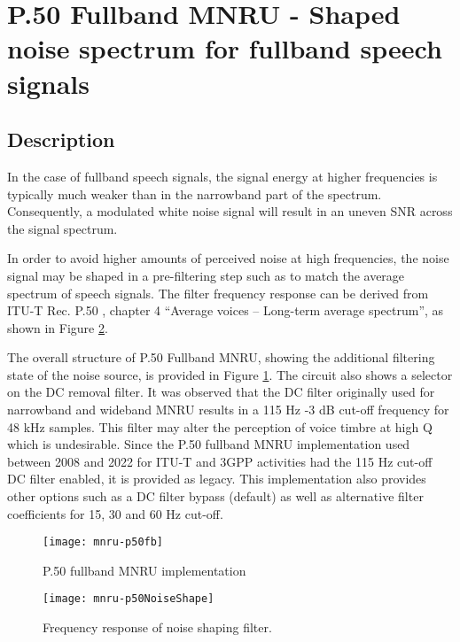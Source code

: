 \section{P.50 Fullband MNRU - Shaped noise spectrum for fullband speech signals} \label{fullband}

\subsection {Description}

In the case of fullband speech signals, the signal energy at higher frequencies is typically much weaker than in the
narrowband part of the spectrum.
Consequently, a modulated white noise signal will result in an uneven SNR across the signal spectrum.

In order to avoid higher amounts of perceived noise at high frequencies, the noise signal may be shaped in a pre-filtering
step such as to match the average spectrum of speech signals.
The filter frequency response can be derived from ITU-T Rec. P.50 \cite{P.50}, chapter 4 “Average voices – Long-term
average spectrum”, as shown in Figure \ref{MNRUP50}.

The overall structure of P.50 Fullband MNRU, showing the additional filtering state of the noise source, is provided in
Figure \ref{MNRUP50FB}.
The circuit also shows a selector on the DC removal filter.
It was observed that the DC filter originally used for narrowband and wideband MNRU results in a 115 Hz -3 dB cut-off frequency for 48 kHz samples.
This filter may alter the perception of voice timbre at high Q which is undesirable.
Since the P.50 fullband MNRU implementation used between 2008 and 2022 for ITU-T and 3GPP activities had the 115 Hz cut-off DC filter enabled, it is provided as legacy.
This implementation also provides other options such as a DC filter bypass (default) as well as alternative filter coefficients for 15, 30 and 60 Hz cut-off.

\begin{figure}[ht]
    \begin{center}
        \texttt{[image: mnru-p50fb]}
    \end{center}
    \caption{P.50 fullband MNRU implementation\label{MNRUP50FB}}
\end{figure}

\begin{figure}[ht]
    \begin{center}
        \texttt{[image: mnru-p50NoiseShape]}
    \end{center}
    \caption{Frequency response of noise shaping filter.\label{MNRUP50}}
\end{figure}

